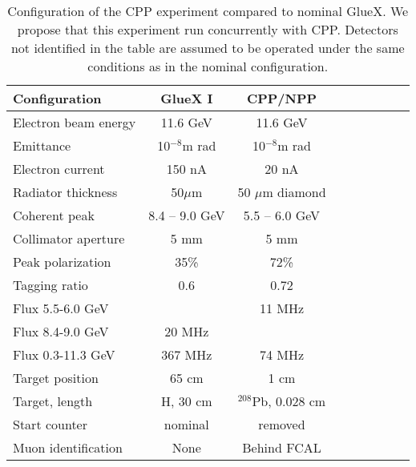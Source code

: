 \begin{table}[t]
\caption{Configuration of the CPP experiment compared to nominal GlueX. We propose that this experiment run concurrently with CPP. Detectors not identified
in the table are assumed to be operated under the same conditions as in the nominal configuration.
\label{tab:ccp_config}
}
\begin{center}
\begin{tabular}{|l|c|c|c|c|c|c|c|c|}
\hline
\hline 
  Configuration  & GlueX I  & CPP/NPP   \\  \hline \hline
  Electron  beam energy  &   11.6 GeV   &  11.6 GeV   \\ \hline 
  Emittance   &   10$^{-8}$m rad   &  10$^{-8}$m rad   \\ \hline 
  Electron  current  &   150 nA   &  20 nA  \\ \hline
  Radiator thickness  &   50$\mu$m  &  50 $\mu$m diamond   \\ \hline 
  Coherent peak  &   8.4 -- 9.0 GeV   &  5.5 -- 6.0 GeV     \\ \hline 
  Collimator aperture  &  5 mm & 5 mm   \\ \hline  
  Peak polarization  &   35\%   &  72\%     \\ \hline 
  Tagging ratio  &   0.6   &   0.72 \\ \hline  
  Flux 5.5-6.0 GeV  &      &   11 MHz \\ \hline   
  Flux 8.4-9.0 GeV  &  20 MHz    &    \\ \hline  
  Flux 0.3-11.3 GeV  &  367 MHz    &   74 MHz \\ \hline 
  Target position  &   65 cm   &  1 cm    \\ \hline 
  Target, length   &  H, 30 cm   &  $^{208}$Pb, 0.028 cm   \\
 \hline  
  Start counter & nominal & removed \\ \hline
  Muon identification  &  None   &   Behind FCAL    \\ \hline   
  \hline
\end{tabular}
\end{center}
\end{table}
